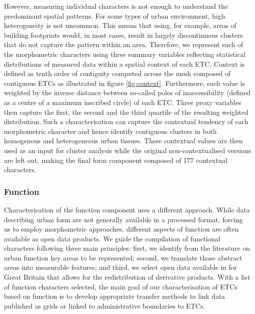 \documentclass[fleqn,10pt]{wlscirep}
\begin{document}
However, measuring individual characters is not enough to understand the predominant
spatial patterns. For some types of urban environment, high heterogeneity is not
uncommon. This means that using, for example, areas of building footprints would, in most cases, result
in largely discontinuous clusters that do not capture the pattern within an area. Therefore, we represent each of the
morphometric characters using three summary variables reflecting statistical distributions
of measured data within a spatial context of each ETC. Context is defined as
tenth
order of contiguity computed across the mesh composed of contiguous ETCs as illustrated
in figure \ref{fig:context}. Furthermore, each
value is weighted by the inverse distance between so-called poles of inaccessibility
(defined as a centre of a maximum inscribed circle) of each ETC. Three proxy variables
then capture the first, the second and the third quartile of the resulting weighted
distribution. Such a characterisation can capture the contextual tendency of each
morphometric character and hence identify contiguous clusters in both homogenous and
heterogeneous urban tissues. These contextual values are then used as an input for
cluster analysis while the original non-contextualised versions are left out, making the
final form component composed of 177 contextual characters.

\subsubsection*{Function}
Characterisation of the function component uses a different approach. While data
describing urban form are not generally available in a processed format, forcing us to employ morphometric approaches, different aspects of function are often available as
open data products.
%
We guide the compilation of functional characters following three main
principles: first, we identify from the literature on urban function key areas
to be represented; second, we translate those abstract areas into measurable
features; and third, we select open data available in for Great Britain that
allows for the redistribution of derivative products.
%
With a list of function characters selected, the main goal of our characterisation of ETCs based on
function is to develop appropriate transfer methods to link data published as grids or
linked to administrative boundaries to ETCs.
\end{document}
